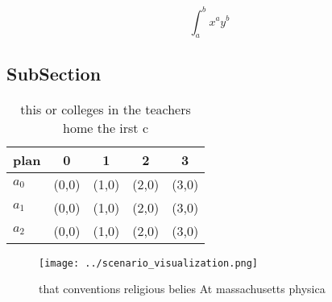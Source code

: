 \documentclass[a4paper]{article}
\begin{document}
\[ \int_{a}^{b}{x^{a}y^{b}} \]

\subsection{SubSection}

\begin{table}
\begin{adjustbox}{width=0.5\columnwidth}
\begin{tabular}{|l|l|l|l|l|}
\hline
\textbf{plan} & \multicolumn{1}{c|}{\textbf{0}} & \multicolumn{1}{c|}{\textbf{1}} & \multicolumn{1}{c|}{\textbf{2}} & \multicolumn{1}{c|}{\textbf{3}} \\ \hline
\textbf{$a_0$}  & (0,0) & (1,0) & (2,0) & (3,0) \\ \hline
\textbf{$a_1$}  & (0,0) & (1,0) & (2,0) & (3,0) \\ \hline
\textbf{$a_2$}  & (0,0) & (1,0) & (2,0) & (3,0) \\ \hline
\end{tabular}
\end{adjustbox}
\caption{ this or colleges in the teachers home the irst c
}
\end{table}

\begin{figure}
\centering
\texttt{[image: ../scenario\_visualization.png]}
\caption{ that conventions religious belies At massachusetts physica
}
\end{figure}
 
\end{document}
